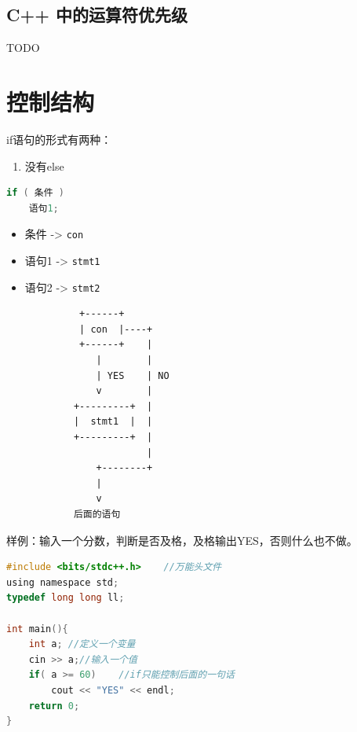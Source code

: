 \documentclass[
  paper=a4,
  ,captions=tableheading
]{scrbook}
\newcommand{\passthrough}[1]{#1}
\providecommand{\tightlist}{%
  \setlength{\itemsep}{0pt}\setlength{\parskip}{0pt}}
\begin{document}
\hypertarget{c-ux4e2dux7684ux8fd0ux7b97ux7b26ux4f18ux5148ux7ea7}{%
\subsection{C++
中的运算符优先级}\label{c-ux4e2dux7684ux8fd0ux7b97ux7b26ux4f18ux5148ux7ea7}}

TODO

\hypertarget{ux63a7ux5236ux7ed3ux6784}{%
\section{控制结构}\label{ux63a7ux5236ux7ed3ux6784}}

if语句的形式有两种：

\begin{enumerate}
\def\labelenumi{\arabic{enumi}.}
\tightlist
\item
  没有else
\end{enumerate}

\begin{lstlisting}[language={C++}]
if ( 条件 )
    语句1;
\end{lstlisting}

\begin{itemize}
\tightlist
\item
  条件 -\textgreater{} \passthrough{\lstinline!con!}
\item
  语句1 -\textgreater{} \passthrough{\lstinline!stmt1!}
\item
  语句2 -\textgreater{} \passthrough{\lstinline!stmt2!}
\end{itemize}

\begin{lstlisting}
             +------+
             | con  |----+
             +------+    |
                |        |
                | YES    | NO
                v        |
            +---------+  |
            |  stmt1  |  |
            +---------+  |
                         |
                +--------+
                |
                v
            后面的语句
\end{lstlisting}

样例：输入一个分数，判断是否及格，及格输出YES，否则什么也不做。

\begin{lstlisting}[language=C]
#include <bits/stdc++.h>    //万能头文件
using namespace std;
typedef long long ll;

int main(){
    int a; //定义一个变量
    cin >> a;//输入一个值
    if( a >= 60)    //if只能控制后面的一句话
        cout << "YES" << endl;
    return 0;
}
\end{lstlisting}
\end{document}
